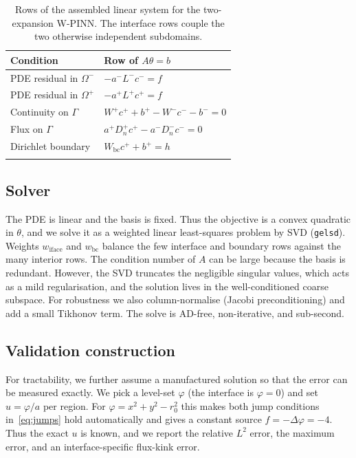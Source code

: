 \documentclass[pdflatex,sn-mathphys-num]{sn-jnl}%
\theoremstyle{thmstyleone}%
\theoremstyle{thmstyletwo}%
\theoremstyle{thmstylethree}%
\begin{document}
\begin{table}[t]
\caption{Rows of the assembled linear system for the two-expansion W-PINN. The interface rows couple the two otherwise independent subdomains.}\label{tab:rows}%
\begin{tabular}{@{}ll@{}}
\toprule
Condition & Row of $A\theta=b$ \\
\midrule
PDE residual in $\Omega^-$ & $-a^- L^- c^- = f$ \\
PDE residual in $\Omega^+$ & $-a^+ L^+ c^+ = f$ \\
Continuity on $\Gamma$ & $W^+ c^+ + b^+ - W^- c^- - b^- = 0$ \\
Flux on $\Gamma$ & $a^+ D_n^+ c^+ - a^- D_n^- c^- = 0$ \\
Dirichlet boundary & $W_{\mathrm{bc}} c^+ + b^+ = h$ \\
\botrule
\end{tabular}
\end{table}

\subsection{Solver}\label{subsec:solver}
The PDE is linear and the basis is fixed. Thus the objective is a convex quadratic in $\theta$, and we solve it as a weighted linear least-squares problem by SVD (\texttt{gelsd}). Weights $w_{\mathrm{iface}}$ and $w_{\mathrm{bc}}$ balance the few interface and boundary rows against the many interior rows. The condition number of $A$ can be large because the basis is redundant. However, the SVD truncates the negligible singular values, which acts as a mild regularisation, and the solution lives in the well-conditioned coarse subspace. For robustness we also column-normalise (Jacobi preconditioning) and add a small Tikhonov term. The solve is AD-free, non-iterative, and sub-second.

\subsection{Validation construction}\label{subsec:mms}
For tractability, we further assume a manufactured solution so that the error can be measured exactly. We pick a level-set $\varphi$ (the interface is $\varphi=0$) and set $u=\varphi/a$ per region. For $\varphi=x^2+y^2-r_0^2$ this makes both jump conditions in~\eqref{eq:jumps} hold automatically and gives a constant source $f=-\Delta\varphi=-4$. Thus the exact $u$ is known, and we report the relative $L^2$ error, the maximum error, and an interface-specific flux-kink error.
\end{document}
